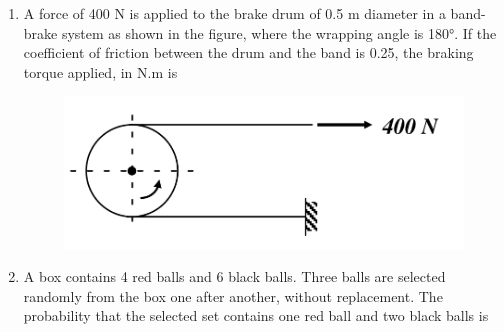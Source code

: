 \documentclass[journal,11pt,onecolumn]{IEEEtran}
\begin{document}
\begin{enumerate}[resume]
    \item A force of 400 N is applied to the brake drum of 0.5 m diameter in a band-brake system as shown in the figure, where the wrapping angle is 180°. If the coefficient of friction between the drum and the band is 0.25, the braking torque applied, in N.m is
          \begin{figure}[H]
              \centering
              \includegraphics[scale=0.2]{q44}
              \caption{}
              \label{q44}
          \end{figure}

          \begin{enumerate}
          \end{enumerate}

    \item A box contains 4 red balls and 6 black balls. Three balls are selected randomly from the box one after another, without replacement. The probability that the selected set contains one red ball and two black balls is

          \begin{enumerate}
          \end{enumerate}


\end{enumerate}
\end{document}
